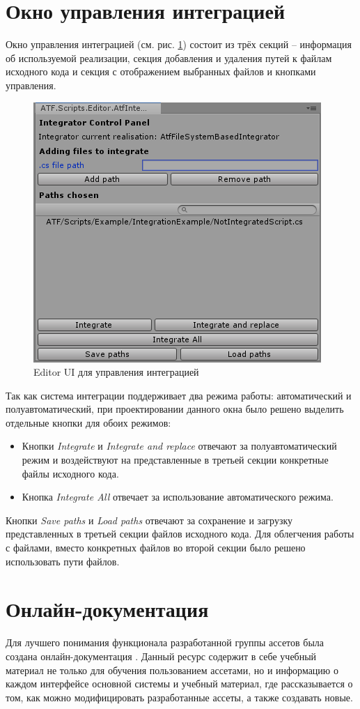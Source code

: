 \section{Окно управления интеграцией}

Окно управления интеграцией (см. рис. \ref{integratorUI}) состоит из трёх секций -- информация об используемой реализации, секция добавления и удаления путей к файлам исходного кода и секция с отображением выбранных файлов и кнопками управления.

\begin{figure}[h]
	\centering
	\includegraphics[width=0.7\linewidth]{integrator.PNG}
	\caption{Editor UI для управления интеграцией}
	\label{integratorUI}
\end{figure}

Так как система интеграции поддерживает два режима работы: автоматический и полуавтоматический, при проектировании данного окна было решено выделить отдельные кнопки для обоих режимов:
\begin{itemize}
	\item
	Кнопки \textit{Integrate} и \textit{Integrate and replace} отвечают за полуавтоматический режим и воздействуют на представленные в третьей секции конкретные файлы исходного кода.
	\item
	Кнопка \textit{Integrate All} отвечает за использование автоматического режима.
\end{itemize}

Кнопки \textit{Save paths} и \textit{Load paths} отвечают за сохранение и загрузку представленных в третьей секции файлов исходного кода. Для облегчения работы с файлами, вместо конкретных файлов во второй секции было решено использовать пути файлов.

\section{Онлайн-документация}
Для лучшего понимания функционала разработанной группы ассетов была создана онлайн-документация \cite{atf_docs}. Данный ресурс содержит в себе учебный материал не только для обучения пользованием ассетами, но и информацию о каждом интерфейсе основной системы и учебный материал, где рассказывается о том, как можно модифицировать разработанные ассеты, а также создавать новые.

